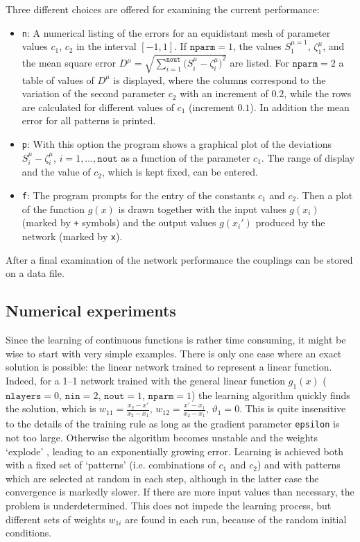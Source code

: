 Three different choices are offered for examining the current performance:
\begin{itemize}
\item \texttt{n}: A numerical listing of the errors for an equidistant mesh of parameter values $c_1$, $c_2$ in the interval $[-1,1]$. If $\texttt{nparm}=1$, the values $S_1^{\mu=1}$, $\zeta_1^\mu$, and the mean square error $D^\mu=\sqrt{\sum_{i=1}^{\texttt{nout}}{\bigl(S_i^\mu-\zeta_i^\mu\bigr)}^2}$ are listed. For $\texttt{nparm}=2$ a table of values of $D^\mu$ is displayed, where the columns correspond to the variation of the second parameter $c_2$ with an increment of $0.2$, while the rows are calculated for different values of $c_1$ (increment $0.1$). In addition the mean error for all patterns is printed.
\item \texttt{p}: With this option the program shows a graphical plot of the deviations $S_i^\mu-\zeta_i^\mu$, $i=1,\ldots,\texttt{nout}$ as a function of the parameter $c_1$. The range of display and the value of $c_2$, which is kept fixed, can be entered.
\item \texttt{f}: The program prompts for the entry of the constants $c_1$ and $c_2$. Then a plot of the function $g(x)$ is drawn together with the input values $g(x_i)$ (marked by \texttt{+} symbols) and the output values $g(x_i')$ produced by the network (marked by \texttt{x}).
\end{itemize}

After a final examination of the network performance the couplings can be stored on a data file.
\subsection{Numerical experiments}
Since the learning of continuous functions is rather time consuming, it might be wise to start with very simple examples. There is only one case where an exact solution is possible: the linear network trained to represent a linear function. Indeed, for a 1--1 network trained with the general linear function $g_1(x)$ ($\texttt{nlayers}=0$, $\texttt{nin}=2$, $\texttt{nout}=1$, $\texttt{nparm}=1$) the learning algorithm quickly finds the solution, which is $w_{11}=\frac{x_2-x'}{x_2-x_1}$, $w_{12}=\frac{x'-x_1}{x_2-x_1}$, $\vartheta_1=0$. This is quite insensitive to the details of the training rule as long as the gradient parameter \texttt{epsilon} is not too large. Otherwise the algorithm becomes unstable and the weights `explode' , leading to an exponentially growing error. Learning is achieved both with a fixed set of `patterns' (i.e. combinations of $c_1$ and $c_2$) and with patterns which are selected at random in each step, although in the latter case the convergence is markedly slower. If there are more input values than necessary, the problem is underdetermined. This does not impede the learning process, but different sets of weights $w_{1i}$ are found in each run, because of the random initial conditions.

